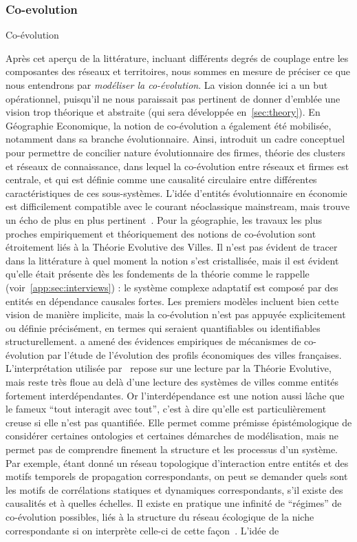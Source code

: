 \subsubsection{Co-evolution}{Co-évolution}


Après cet aperçu de la littérature, incluant différents degrés de couplage entre les composantes des réseaux et territoires, nous sommes en mesure de préciser ce que nous entendrons par \emph{modéliser la co-évolution}. La vision donnée ici a un but opérationnel, puisqu'il ne nous paraissait pas pertinent de donner d'emblée une vision trop théorique et abstraite (qui sera développée en~\ref{sec:theory}). En Géographie Economique, la notion de co-évolution a également été mobilisée, notamment dans sa branche évolutionnaire. Ainsi, \cite{doi:10.1080/00343400802662658} introduit un cadre conceptuel pour permettre de concilier nature évolutionnaire des firmes, théorie des clusters et réseaux de connaissance, dans lequel la co-évolution entre réseaux et firmes est centrale, et qui est définie comme une causalité circulaire entre différentes caractéristiques de ces sous-systèmes. L'idée d'entités évolutionnaire en économie est difficilement compatible avec le courant néoclassique mainstream, mais trouve un écho de plus en plus pertinent~\cite{nelson2009evolutionary}. Pour la géographie, les travaux les plus proches empiriquement et théoriquement des notions de co-évolution sont étroitement liés à la Théorie Evolutive des Villes. Il n'est pas évident de tracer dans la littérature à quel moment la notion s'est cristallisée, mais il est évident qu'elle était présente dès les fondements de la théorie comme le rappelle  (voir~\ref{app:sec:interviews}) : le système complexe adaptatif est composé par des entités en dépendance causales fortes. Les premiers modèles incluent bien cette vision de manière implicite, mais la co-évolution n'est pas appuyée explicitement ou définie précisément, en termes qui seraient quantifiables ou identifiables structurellement. \cite{paulus2004coevolution} a amené des évidences empiriques de mécanismes de co-évolution par l'étude de l'évolution des profils économiques des villes françaises. L'interprétation utilisée par~\cite{schmitt2014modelisation} repose sur une lecture par la Théorie Evolutive, mais reste très floue au delà d'une lecture des systèmes de villes comme entités fortement interdépendantes. Or l'interdépendance est une notion aussi lâche que le fameux ``tout interagit avec tout'', c'est à dire qu'elle est particulièrement creuse si elle n'est pas quantifiée. Elle permet comme prémisse épistémologique de considérer certaines ontologies et certaines démarches de modélisation, mais ne permet pas de comprendre finement la structure et les processus d'un système. Par exemple, étant donné un réseau topologique d'interaction entre entités et des motifs temporels de propagation correspondants, on peut se demander quels sont les motifs de corrélations statiques et dynamiques correspondants, s'il existe des causalités et à quelles échelles. Il existe en pratique une infinité de ``régimes'' de co-évolution possibles, liés à la structure du réseau écologique de la niche correspondante si on interprète celle-ci de cette façon~\cite{holland2012signals}. L'idée de 